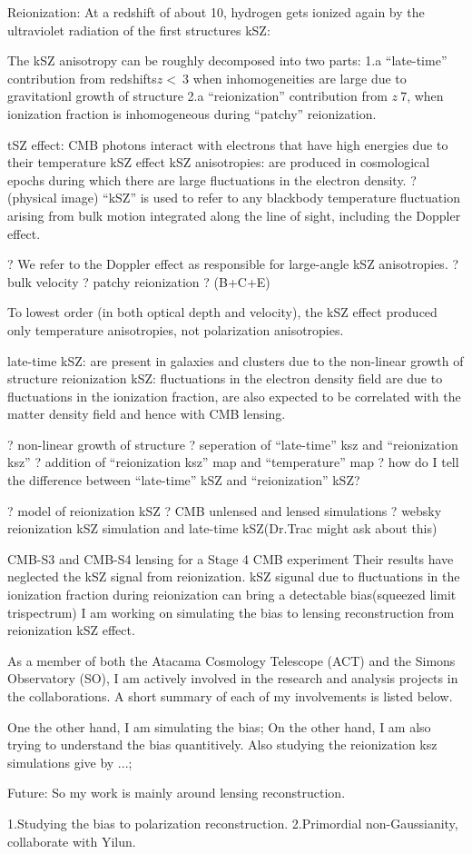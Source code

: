 \documentclass[12pt, notitlepage, onecolumn, amsmath, amssymb, aps]{revtex4-1}
\begin{document}
Reionization: At a redshift of about 10, hydrogen gets ionized again by the ultraviolet radiation of the first structures
kSZ: 

The kSZ anisotropy can be roughly decomposed into two parts: 1.a ``late-time'' contribution from redshifts\(z<~3\) when inhomogeneities are large due to gravitationl growth of structure 2.a ``reionization'' contribution from \(z~7\), when ionization fraction is inhomogeneous during ``patchy'' reionization.\cite{Ferraro:2017fac}

tSZ effect: CMB photons interact with electrons that have high energies due to their temperature
kSZ effect 
kSZ anisotropies: are produced in cosmological epochs during which there are large fluctuations in the electron density. ? (physical image)
``kSZ'' is used to refer to any blackbody temperature fluctuation arising from bulk motion integrated along the line of sight, including the Doppler effect.

? We refer to the Doppler effect as responsible for large-angle kSZ anisotropies.
? bulk velocity
? patchy reionization
? (B+C+E)


To lowest order (in both optical depth and velocity), the kSZ effect produced only temperature anisotropies, not polarization anisotropies. 



late-time kSZ: are present in galaxies and clusters due to the non-linear growth of structure
reionization kSZ: fluctuations in the electron density field are due to fluctuations in the ionization fraction, are also expected to be correlated with the matter density field and hence with CMB lensing. 

? non-linear growth of structure
? seperation of ``late-time'' ksz and ``reionization ksz''
? addition of ``reionization ksz'' map and ``temperature'' map
? how do I tell the difference between ``late-time'' kSZ and ``reionization'' kSZ?

? model of reionization kSZ
? CMB unlensed and lensed simulations
? websky reionization kSZ simulation and late-time kSZ(Dr.Trac might ask about this)

CMB-S3 and CMB-S4 lensing 
for a Stage 4 CMB experiment
Their results have neglected the kSZ signal from reionization. 
kSZ sigunal due to fluctuations in the ionization fraction during reionization can bring a detectable bias(squeezed limit trispectrum)
I am working on simulating the bias to lensing reconstruction from reionization kSZ effect. 


As a member of both the Atacama Cosmology Telescope (ACT) and the
Simons Observatory (SO), I am actively involved in the research and
analysis projects in the collaborations. A short summary of each of my
involvements is listed below.

One the other hand, I am simulating the bias; On the other hand, I am also trying to understand the bias quantitively. Also studying the reionization  ksz simulations give by ...;

Future:
So my work is mainly around lensing reconstruction.

1.Studying the bias to polarization reconstruction.
2.Primordial non-Gaussianity, collaborate with Yilun.


\end{document}
